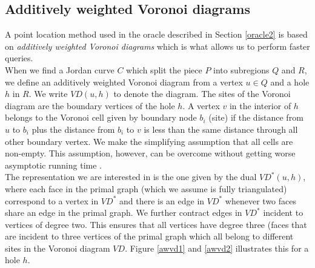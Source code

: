 \subsection{Additively weighted Voronoi diagrams}
A point location method used in the oracle described in Section \ref{oracle2} is based on
\textit{additively weighted Voronoi diagrams} which is what allows us to perform faster
queries. \\
When we find a Jordan curve $C$ which split the piece $P$ into subregions $Q$ and $R$, we
define an additively weighted Voronoi diagram from a vertex $u\in Q$ and a hole
$h$ in $R$. We write $VD(u,h)$ to denote the diagram. The sites of the Voronoi diagram
are the boundary vertices of the hole $h$. A vertex $v$ in the interior of $h$ belongs to
the Voronoi cell given by boundary node $b_i$ (site) if the distance from $u$ to $b_i$
plus the distance from $b_i$ to $v$ is less
than the same distance through all other boundary vertex. We make the simplifying
assumption that all cells are non-empty. This assumption, however, can be overcome
without getting worse asymptotic running time \cite{gawrychowski2017better}.  \\
The representation we are interested in is the one given by the dual $VD^*(u,h)$, where
each face in the primal graph (which we assume is fully triangulated) correspond to a
vertex in $VD^*$ and there is an edge in $VD^*$ whenever two faces share an edge in the
primal graph. We further contract edges in $VD^*$ incident to vertices of degree two.
This ensures that all vertices have degree three (faces that are incident to three
vertices of the primal graph which all belong to different sites in the Voronoi diagram
$VD$. Figure \ref{awvd1} and \ref{awvd2} illustrates this for a hole $h$. \\
